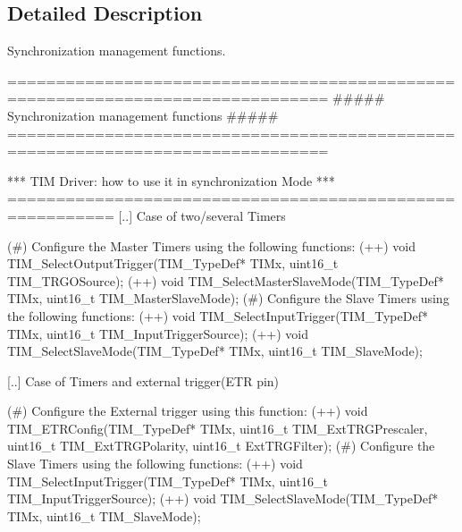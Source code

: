 \subsection{Detailed Description}
Synchronization management functions. \begin{DoxyVerb} ===============================================================================
                 ##### Synchronization management functions #####
 ===============================================================================  
                         
  *** TIM Driver: how to use it in synchronization Mode ***
  ========================================================= 
  [..] Case of two/several Timers
       
       (#) Configure the Master Timers using the following functions:
           (++) void TIM_SelectOutputTrigger(TIM_TypeDef* TIMx, uint16_t TIM_TRGOSource); 
           (++) void TIM_SelectMasterSlaveMode(TIM_TypeDef* TIMx, uint16_t TIM_MasterSlaveMode);  
       (#) Configure the Slave Timers using the following functions: 
           (++) void TIM_SelectInputTrigger(TIM_TypeDef* TIMx, uint16_t TIM_InputTriggerSource);  
           (++) void TIM_SelectSlaveMode(TIM_TypeDef* TIMx, uint16_t TIM_SlaveMode); 
          
  [..] Case of Timers and external trigger(ETR pin)
           
       (#) Configure the External trigger using this function:
           (++) void TIM_ETRConfig(TIM_TypeDef* TIMx, uint16_t TIM_ExtTRGPrescaler, uint16_t TIM_ExtTRGPolarity,
                                   uint16_t ExtTRGFilter);
       (#) Configure the Slave Timers using the following functions: 
           (++) void TIM_SelectInputTrigger(TIM_TypeDef* TIMx, uint16_t TIM_InputTriggerSource);  
           (++) void TIM_SelectSlaveMode(TIM_TypeDef* TIMx, uint16_t TIM_SlaveMode); \end{DoxyVerb}



